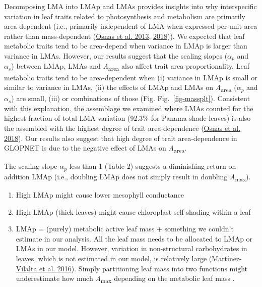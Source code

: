 \documentclass[
  12pt,
  a4paper,
,tablecaptionabove
]{scrartcl}
\providecommand{\tightlist}{%
  \setlength{\itemsep}{0pt}\setlength{\parskip}{0pt}}
\begin{document}
Decomposing LMA into LMAp and LMAs provides insights into why
interspecific variation in leaf traits related to photosynthesis and
metabolism are primarily area-dependent (i.e., primarily independent of
LMA when expressed per-unit area rather than mass-dependent
(\protect\hyperlink{ref-Osnas2013}{Osnas et al. 2013},
\protect\hyperlink{ref-Osnas2018}{2018})). We expected that leaf
metabolic traits tend to be area-depend when variance in LMAp is larger
than variance in LMAs. However, our results suggest that the scaling
slopes (\(\alpha_p\) and \(\alpha_s\)) between LMAp, LMAs and
\emph{A}\textsubscript{area} also affect trait area proportionality.
Leaf metabolic traits tend to be area-dependent when (i) variance in
LMAp is small or similar to variance in LMAs, (ii) the effects of LMAp
and LMAs on \emph{A}\textsubscript{area} (\(\alpha_p\) and \(\alpha_s\))
are small, (iii) or combinations of those (Fig. Fig.~\ref{fig-massplt}).
Consistent with this explanation, the assemblage we examined where LMAs
counted for the highest fraction of total LMA variation (92.3\% for
Panama shade leaves) is also the assembled with the highest degree of
trait area-dependence (\protect\hyperlink{ref-Osnas2018}{Osnas et al.
2018}). Our results also suggest that high degree of trait
area-dependence in GLOPNET is due to the negative effect of LMAs on
\emph{A}\textsubscript{area}.

The scaling slope \(\alpha_p\) less than 1 (Table 2) suggests a
diminishing return on addition LMAp (i.e., doubling LMAp does not simply
result in doubling \emph{A}\textsubscript{max}).

\begin{enumerate}
\def\labelenumi{\arabic{enumi}.}
\tightlist
\item
  High LMAp might cause lower mesophyll conductance
\item
  High LMAp (thick leaves) might cause chloroplast self-shading within a
  leaf
\item
  LMAp = (purely) metabolic active leaf mass + something we couldn't
  estimate in our analysis. All the leaf mass needs to be allocated to
  LMAp or LMAs in our model. However, variation in non-structural
  carbohydrates in leaves, which is not estimated in our model, is
  relatively large
  (\protect\hyperlink{ref-Martinez-Vilalta2016}{Martínez-Vilalta et al.
  2016}). Simply partitioning leaf mass into two functions might
  underestimate how much \emph{A}\textsubscript{max} depending on the
  metabolic leaf mass .
\end{enumerate}
\end{document}
